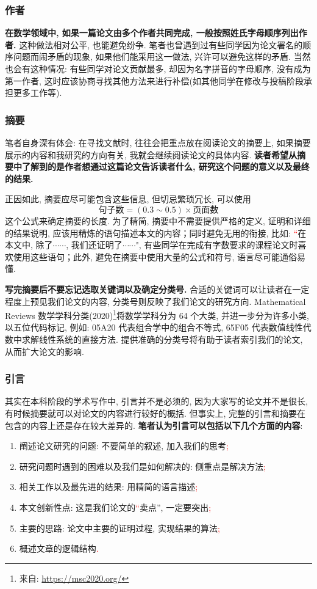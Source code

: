 \documentclass{formatBook}
\newcommand{\XG}[1]{\textcolor{red}{#1}}
\begin{document}
\subsubsection{作者}
\textbf{在数学领域中, 如果一篇论文由多个作者共同完成, 一般按照姓氏字母顺序列出作者.} 这种做法相对公平, 也能避免纷争. 笔者也曾遇到过有些同学因为论文署名的顺序问题而闹矛盾的现象, 如果他们能采用这一做法, 兴许可以避免这样的矛盾. 当然也会有这种情况: 有些同学对论文贡献最多, 却因为名字拼音的字母顺序, 没有成为第一作者, 这时应该协商寻找其他方法来进行补偿(如其他同学在修改与投稿阶段承担更多工作等).
\subsubsection{摘要}
笔者自身深有体会: 在寻找文献时, 往往会把重点放在阅读论文的摘要上, 如果摘要展示的内容和我研究的方向有关, 我就会继续阅读论文的具体内容. \textbf{读者希望从摘要中了解到的是作者想通过这篇论文告诉读者什么, 研究这个问题的意义以及最终的结果.}\par
正因如此, 摘要应尽可能包含这些信息, 但切忌繁琐冗长, 可以使用 $$\text{句子数}=(0.3 \sim 0.5)\times \text{页面数}$$ 这个公式\cite{pakhow}来确定摘要的长度. 为了精简, 摘要中不需要提供严格的定义, 证明和详细的结果说明, 应该用精炼的语句描述本文的内容；同时避免无用的衔接, 比如: \XG{``}在本文中, 除了$\cdots\cdots$, 我们还证明了$\cdots\cdots$", 有些同学在完成有字数要求的课程论文时喜欢使用这些语句；此外, 避免在摘要中使用大量的公式和符号, 语言尽可能通俗易懂. \par
\textbf{写完摘要后不要忘记选取关键词以及确定分类号.} 合适的关键词可以让读者在一定程度上预见我们论文的内容, 分类号则反映了我们论文的研究方向. Mathematical Reviews 数学学科分类(2020)\footnote{来自: \url{https://msc2020.org/}}将数学学科分为 64 个大类, 并进一步分为许多小类, 以五位代码标记, 例如: 05A20 代表组合学中的组合不等式, 65F05 代表数值线性代数中求解线性系统的直接方法. 提供准确的分类号将有助于读者索引我们的论文, 从而扩大论文的影响.
\subsubsection{引言}
其实在本科阶段的学术写作中, 引言并不是必须的, 因为大家写的论文并不是很长, 有时候摘要就可以对论文的内容进行较好的概括. 但事实上, 完整的引言和摘要在包含的内容上还是存在较大差异的. \textbf{笔者认为引言可以包括以下几个方面的内容}:
\begin{enumerate}
    \item 阐述论文研究的问题: 不要简单的叙述, 加入我们的思考\XG{;}
    \item 研究问题时遇到的困难以及我们是如何解决的: 侧重点是解决方法\XG{;}
    \item 相关工作以及最先进的结果: 用精简的语言描述\XG{;}
    \item 本文创新性点: 这是我们论文的\XG{``}卖点'', 一定要突出\XG{;}
    \item 主要的思路: 论文中主要的证明过程, 实现结果的算法\XG{;}
    \item 概述文章的逻辑结构\XG{.}
\end{enumerate}
\end{document}
